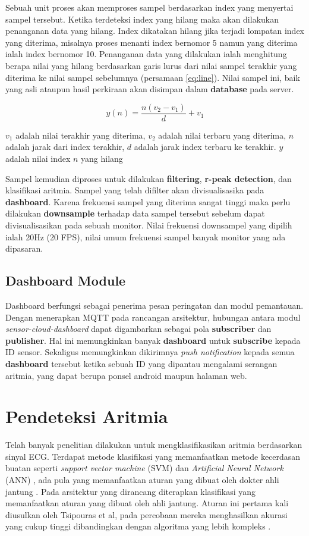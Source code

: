 \documentclass[]{indojc_single}
\begin{document}
Sebuah unit proses akan memproses sampel berdasarkan index yang menyertai sampel tersebut. Ketika terdeteksi index yang hilang maka akan dilakukan penanganan data yang hilang. Index dikatakan hilang jika terjadi lompatan index yang diterima, misalnya proses menanti index bernomor 5 namun yang diterima ialah index bernomor 10. Penanganan data yang dilakukan ialah menghitung berapa nilai yang hilang berdasarkan garis lurus dari nilai sampel terakhir yang diterima ke nilai sampel sebelumnya (persamaan \ref{eq:line}). Nilai sampel ini, baik yang asli ataupun hasil perkiraan akan disimpan dalam \textbf{database} pada server.

\begin{equation}
y(n) = \dfrac{n (v_{2} - v_{1})}{d} + v_{1}
\label{eq:line}
\end{equation}

$v_{1}$ adalah nilai terakhir yang diterima, $v_{2}$ adalah nilai terbaru yang diterima, $n$ adalah jarak dari index terakhir, $d$ adalah jarak index terbaru ke terakhir. $y$ adalah nilai index $n$ yang hilang

Sampel kemudian diproses untuk dilakukan \textbf{filtering}, \textbf{r-peak detection}, dan klasifikasi aritmia. Sampel yang telah difilter akan divisualisasika pada \textbf{dashboard}. Karena frekuensi sampel yang diterima sangat tinggi maka perlu dilakukan \textbf{downsample} terhadap data sampel tersebut sebelum dapat divisualisasikan pada sebuah monitor. Nilai frekuensi downsampel yang dipilih ialah 20Hz (20 FPS), nilai umum frekuensi sampel banyak monitor yang ada dipasaran.

\subsection{Dashboard Module}
Dashboard berfungsi sebagai penerima pesan peringatan dan modul pemantauan. Dengan menerapkan MQTT pada rancangan arsitektur, hubungan antara modul \textit{sensor-cloud-dashboard} dapat digambarkan sebagai pola \textbf{subscriber} dan \textbf{publisher}. Hal ini memungkinkan banyak \textbf{dashboard} untuk \textbf{subscribe} kepada ID sensor. Sekaligus memungkinkan dikirimnya \textit{push notification} kepada semua \textbf{dashboard} tersebut ketika sebuah ID yang dipantau mengalami serangan aritmia, yang dapat berupa ponsel android maupun halaman web.
\section{Pendeteksi Aritmia} \label{section:bab3}
Telah banyak penelitian dilakukan untuk mengklasifikasikan aritmia berdasarkan sinyal ECG. Terdapat metode klasifikasi yang memanfaatkan metode kecerdasan buatan seperti \textit{support vector machine} (SVM) \cite{aritmia_svm} dan \textit{Artificial Neural Network} (ANN) \cite{aritmia_ann}, ada pula yang memanfaatkan aturan yang dibuat oleh dokter ahli jantung \cite{tsipouras}. Pada arsitektur yang dirancang diterapkan klasifikasi yang memanfaatkan aturan yang dibuat oleh ahli jantung. Aturan ini pertama kali diusulkan oleh Tsipouras et al, pada percobaan mereka menghasilkan akurasi yang cukup tinggi dibandingkan dengan algoritma yang lebih kompleks \cite{tsipouras}.
\end{document}
